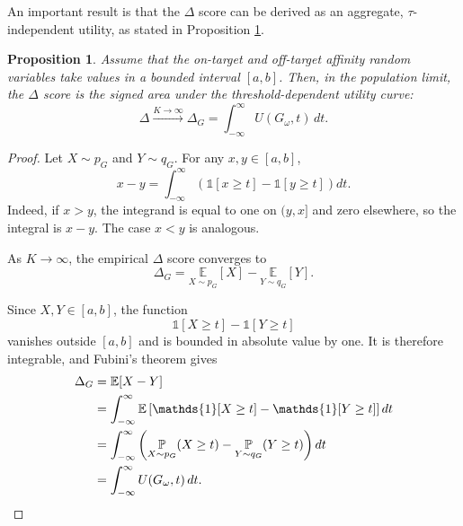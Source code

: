 \documentclass[a4paper,12pt]{article}
\newtheorem{proposition}{Proposition}[section]
\begin{document}
An important result is that the $\Delta$ score can be derived as an aggregate, $\tau$-independent utility, as stated in Proposition \ref{prop:delta}.

\begin{proposition}
    \label{prop:delta}
    Assume that the on-target and off-target affinity random variables take
    values in a bounded interval $[a,b]$. Then, in the population limit, the
    $\Delta$ score is the signed area under the threshold-dependent utility
    curve:
    \begin{equation*}
        \Delta
        \overset{K\rightarrow\infty}{\longrightarrow}
        \Delta_G
        =
        \int_{-\infty}^{\infty}
        U(G_\omega,t)\,dt.
    \end{equation*}
\end{proposition}

\begin{proof}
    Let $X\sim p_G$ and $Y\sim q_G$. For any $x,y\in[a,b]$,
    \begin{equation*}
        x-y
        =
        \int_{-\infty}^{\infty}
        \left(
        \mathds{1}[x\geq t]
        -
        \mathds{1}[y\geq t]
        \right)dt.
    \end{equation*}
    Indeed, if $x>y$, the integrand is equal to one on $(y,x]$ and zero
elsewhere, so the integral is $x-y$. The case $x<y$ is analogous.

As $K\rightarrow\infty$, the empirical $\Delta$ score converges to
\begin{equation*}
    \Delta_G
    =
    \underset{X\sim p_G}{\mathbb E}[X]
    -
    \underset{Y\sim q_G}{\mathbb E}[Y].
\end{equation*}

Since $X,Y\in[a,b]$, the function
\begin{equation*}
    \mathds{1}[X\geq t]-\mathds{1}[Y\geq t]
\end{equation*}
vanishes outside $[a,b]$ and is bounded in absolute value by one.
It is therefore integrable, and Fubini's theorem gives
\begin{align*}
    \Delta_G
    &=
    \mathbb E[X-Y]
    \\
    &=
    \int_{-\infty}^{\infty}
    \mathbb E
    \left[
        \mathds{1}[X\geq t]
        -
        \mathds{1}[Y\geq t]
        \right]dt
    \\
    &=
    \int_{-\infty}^{\infty}
    \left(
    \underset{X\sim p_G}{\mathbb P}(X\geq t)
    -
    \underset{Y\sim q_G}{\mathbb P}(Y\geq t)
    \right)dt
    \\
    &=
    \int_{-\infty}^{\infty}
    U(G_\omega,t)\,dt.
    \qedhere
\end{align*}
\end{proof}
\end{document}
